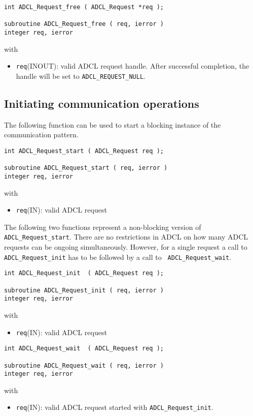 \begin{verbatim}
int ADCL_Request_free ( ADCL_Request *req );

subroutine ADCL_Request_free ( req, ierror )
integer req, ierror
\end{verbatim}
with
\begin{itemize}
\item {\tt req}(INOUT): valid ADCL request handle. After successful
  completion, the handle will be set to {\tt ADCL\_REQUEST\_NULL}.
\end{itemize}
\hspace{1cm}

\subsection{Initiating communication operations}

The following function can be used to start a blocking instance of the communication pattern.
\begin{verbatim}
int ADCL_Request_start ( ADCL_Request req );

subroutine ADCL_Request_start ( req, ierror )
integer req, ierror
\end{verbatim}
with
\begin{itemize}
\item {\tt req}(IN): valid ADCL request
\end{itemize}
\hspace{1cm}

The following two functions represent a non-blocking version of {\tt
  ADCL\_Request\_start}.  There are no restrictions in ADCL on how many ADCL
requests can be ongoing simultaneously. However, for a single request a call
to {\tt ADCL\_Request\_init} has to be followed by a call to {\tt
  ADCL\_Request\_wait}.
\begin{verbatim}
int ADCL_Request_init  ( ADCL_Request req );

subroutine ADCL_Request_init ( req, ierror )
integer req, ierror
\end{verbatim}
with
\begin{itemize}
\item {\tt req}(IN): valid ADCL request
\end{itemize}
\hspace{1cm}

\begin{verbatim}
int ADCL_Request_wait  ( ADCL_Request req );

subroutine ADCL_Request_wait ( req, ierror )
integer req, ierror
\end{verbatim}
with
\begin{itemize}
\item {\tt req}(IN): valid ADCL request started with {\tt ADCL\_Request\_init}.
\end{itemize}
\hspace{1cm}

